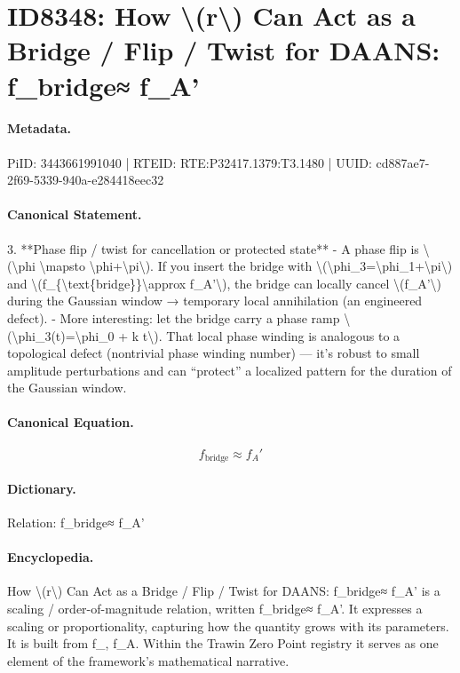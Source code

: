 \section*{ID8348: How \textbackslash{}(r\textbackslash{}) Can Act as a Bridge / Flip / Twist for DAANS: f\_bridge≈ f\_A'}
\paragraph{Metadata.}
PiID: 3443661991040 | RTEID: RTE:P32417.1379:T3.1480 | UUID: cd887ae7-2f69-5339-940a-e284418eec32

\paragraph{Canonical Statement.}
3. **Phase flip / twist for cancellation or protected state** - A phase flip is \textbackslash{}(\textbackslash{}phi \textbackslash{}mapsto \textbackslash{}phi+\textbackslash{}pi\textbackslash{}). If you insert the bridge with \textbackslash{}(\textbackslash{}phi\_3=\textbackslash{}phi\_1+\textbackslash{}pi\textbackslash{}) and \textbackslash{}(f\_\{\textbackslash{}text\{bridge\}\}\textbackslash{}approx f\_A'\textbackslash{}), the bridge can locally cancel \textbackslash{}(f\_A'\textbackslash{}) during the Gaussian window → temporary local annihilation (an engineered defect). - More interesting: let the bridge carry a phase ramp \textbackslash{}(\textbackslash{}phi\_3(t)=\textbackslash{}phi\_0 + k t\textbackslash{}). That local phase winding is analogous to a topological defect (nontrivial phase winding number) — it’s robust to small amplitude perturbations and can “protect” a localized pattern for the duration of the Gaussian window.

\paragraph{Canonical Equation.}
\[
f_{\text{bridge}}\approx f_A'
\]

\paragraph{Dictionary.}
Relation: f\_bridge≈ f\_A'

\paragraph{Encyclopedia.}
How \textbackslash{}(r\textbackslash{}) Can Act as a Bridge / Flip / Twist for DAANS: f\_bridge≈ f\_A' is a scaling / order-of-magnitude relation, written f\_bridge≈ f\_A'. It expresses a scaling or proportionality, capturing how the quantity grows with its parameters. It is built from f\_, f\_A. Within the Trawin Zero Point registry it serves as one element of the framework's mathematical narrative.

